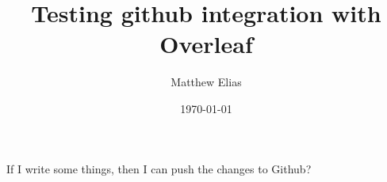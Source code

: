 \documentclass[12pt,a4paper]{article}
\title{Testing github integration with Overleaf}
\author{Matthew Elias}
\date{\today}
\begin{document}
\maketitle

If I write some things, then I can push the changes to Github?
\end{document}
